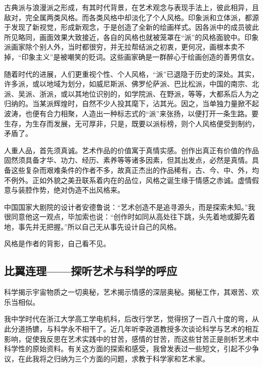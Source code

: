\documentclass{article}
\begin{document}
古典派与浪漫派之形成，有其时代背景，在艺术观念与表现手法上，彼此相异，且敌对，完全属两类风格。而各类风格中却淡化了个人风格。印象派和立体派，都源于发现了新视觉，形成新观念，于是创造了全新的绘画样式。因各派中的成员彼此所见略同，画面效果大致接近，各自的风格也就被笼罩在“派”的风格面貌中。印象派画家除个别人外，当时都很穷，并无拉帮结派之初衷，更何况，画根本卖不掉，“印象主义”是被嘲笑的贬词。这些画家确是一群醉心于绘画创造的善男信女。

随着时代的进展，人们更重视个性、个人风格，“派”已退隐于历史的深处。其实，许多派，或以地域为划分，如威尼斯派、佛罗伦萨派、巴比松派，中国的南宗、北派、吴派、浙派，或以其地位识别的，如学院派、在野派，等等，大都系后人为之归纳的。当某派辉煌时，自然不少人投其麾下，沾其光。因之，当单独力量掀不起波涛，也便有合力相聚，人造出一种标志式的“派”来张扬，以便打开一条生路。要生存，为生存而发展，无可厚非，只是，既要以派标榜，则个人风格便受到制约，矛盾了。

人重人品，首先须真诚。艺术作品的价值寓于真情实感。创作出真正有价值的作品固然须具备才华、功力、经历、素养等等诸多因素，但其出发点，必然是真情。具备这些复杂而艰难条件的作者不多，故真正杰出的作品稀有，古、今、中、外，均不例外。正如外貌之美丑联系着内在的品位，风格之诞生缘于情感之赤诚。虚情假意与装腔作势，绝对伪造不出风格来。

中国国家大剧院的设计者安德鲁说：“艺术创造不是追寻源头，而是探索未知。”我很同意他这一观点，毕加索也说：“创作时如同从高处往下跳，头先着地或脚先着地，事先并无把握。”所以自己无从事先设计自己的风格。

风格是作者的背影，自己看不见。
\subsection{比翼连理——探听艺术与科学的呼应}
科学揭示宇宙物质之一切奥秘，艺术揭示情感的深层奥秘。揭秘工作，其艰苦、欢乐当相似。

我中学时代在浙江大学高工学电机科，后改行学艺，觉得拐了一百八十度的弯，从此分道扬镳，与科学永不相干了。近几年听李政道教授多次谈论科学与艺术的相互影响，促使我反思在艺术实践中的甘苦，感情的甘苦，而这些甘苦正是剖析艺术中科学性的原始资料。有关这方面的探索和感受，我曾发表过一些短文，引起不少争议，在此我将之归纳为三个方面的问题，求教于科学家和艺术家。
\end{document}
